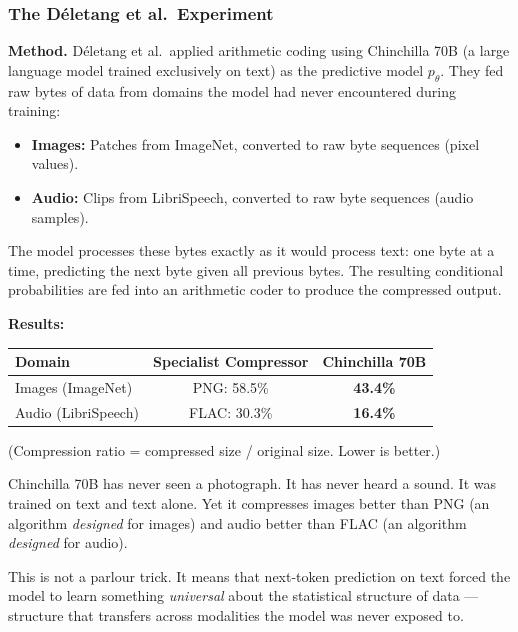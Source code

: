 \documentclass[11pt, a4paper]{article}
\begin{document}
\subsubsection{The D\'{e}letang et al.\ Experiment}

\textbf{Method.} D\'{e}letang et al.\ applied arithmetic coding using
Chinchilla 70B (a large language model trained exclusively on text) as
the predictive model $p_\theta$. They fed raw bytes of data from domains
the model had never encountered during training:

\begin{itemize}[leftmargin=2em]
  \item \textbf{Images:} Patches from ImageNet, converted to raw byte
    sequences (pixel values).
  \item \textbf{Audio:} Clips from LibriSpeech, converted to raw byte
    sequences (audio samples).
\end{itemize}

The model processes these bytes exactly as it would process text: one
byte at a time, predicting the next byte given all previous bytes.
The resulting conditional probabilities are fed into an arithmetic coder
to produce the compressed output.

\textbf{Results:}

\begin{center}
\begin{tabular}{lcc}
\toprule
\textbf{Domain} & \textbf{Specialist Compressor} & \textbf{Chinchilla 70B} \\
\midrule
Images (ImageNet)  & PNG: 58.5\% & \textbf{43.4\%} \\
Audio (LibriSpeech) & FLAC: 30.3\% & \textbf{16.4\%} \\
\bottomrule
\end{tabular}
\end{center}
\small{(Compression ratio = compressed size / original size. Lower is better.)}
\normalsize

\begin{keyinsight}
Chinchilla 70B has never seen a photograph. It has never heard a sound.
It was trained on text and text alone. Yet it compresses images better
than PNG (an algorithm \emph{designed} for images) and audio better than
FLAC (an algorithm \emph{designed} for audio).

This is not a parlour trick. It means that next-token prediction on text
forced the model to learn something \emph{universal} about the statistical
structure of data --- structure that transfers across modalities the model
was never exposed to.
\end{keyinsight}
\end{document}

